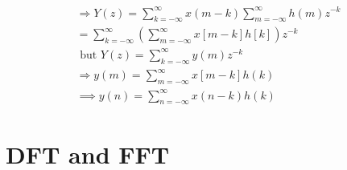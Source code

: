 \documentclass[journal,12pt,twocolumn]{IEEEtran}
\renewcommand\thesection{\arabic{section}}
\begin{document}
\begin{enumerate}[label=\thesection.\arabic*]
		\begin{align}
			\Rightarrow Y(z)=\sum_{k=-\infty}^{\infty} x(m-k) \sum_{m=-\infty}^{\infty} h(m) z^{-k} \\
			=\sum_{k=-\infty}^{\infty}\left(\sum_{m=-\infty}^{\infty} x[m-k] h[k]\right) z^{-k} \\
			\text { but } Y(z)=\sum_{k=-\infty}^{\infty} y(m) z^{-k} \\
			\Rightarrow y(m)=\sum_{m=-\infty}^{\infty} x[m-k] h(k) \\
			\implies y(n)=\sum_{n=-\infty}^{\infty} x(n-k) h(k) 
		\end{align}
		
	\end{enumerate}
	
	\section{DFT and FFT}
\end{document}
